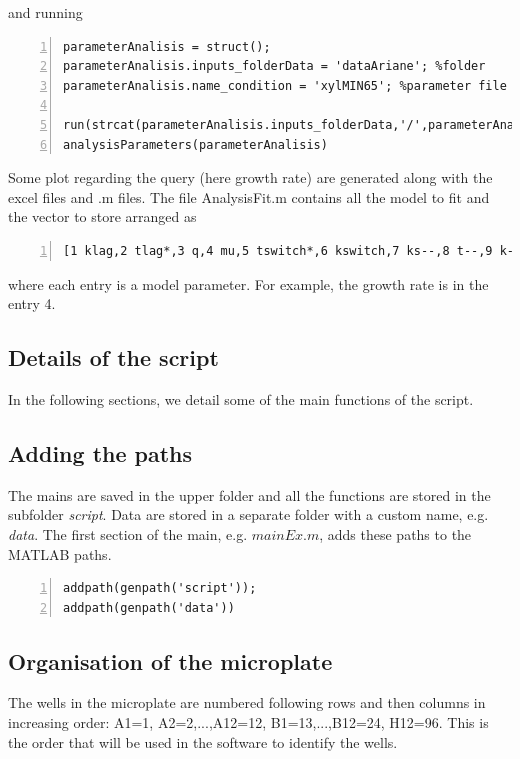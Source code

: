 \documentclass{article}
\begin{document}
and running
\begin{lstlisting}[frame=single,numbers=left,style=Matlab-Pyglike]
%% load and plot several datasets + analysis parameters
parameterAnalisis = struct();
parameterAnalisis.inputs_folderData = 'dataAriane'; %folder
parameterAnalisis.name_condition = 'xylMIN65'; %parameter file

run(strcat(parameterAnalisis.inputs_folderData,'/',parameterAnalisis.name_condition,'.m'))
analysisParameters(parameterAnalisis)
\end{lstlisting}
Some plot regarding the query (here growth rate) are generated along with the excel files and .m files. The file AnalysisFit.m contains all the model to fit and the vector to store arranged as 
\begin{lstlisting}[frame=single,numbers=left,style=Matlab-Pyglike]
[1 klag,2 tlag*,3 q,4 mu,5 tswitch*,6 kswitch,7 ks--,8 t--,9 k--,10 tdeath*,11 kdeath,12 m, 13 x0*, 14 k*, 15 k2*, 16 k3*]
\end{lstlisting}
where each entry is a model parameter. For example, the growth rate is in the entry 4.

\subsection{Details of the script}
In the following sections, we detail some of the main functions of the script.

\subsection{Adding the paths}
The mains are saved in the upper folder and all the functions are stored in the subfolder \textit{script}. Data are stored in a separate folder with a custom name, e.g. \textit{data}. The first section of the main, e.g. $mainEx.m$, adds these paths to the MATLAB paths.
\begin{lstlisting}[frame=single,numbers=left,style=Matlab-Pyglike]
addpath(genpath('script'));
addpath(genpath('data'))
\end{lstlisting}

\subsection{Organisation of the microplate}
The wells in the microplate are numbered following rows and then columns in increasing order: A1=1, A2=2,...,A12=12, B1=13,...,B12=24, H12=96. This is the order that will be used in the software to identify the wells.
\end{document}
